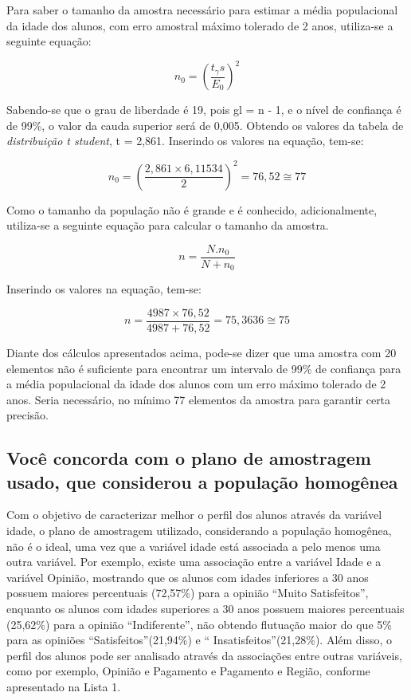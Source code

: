 Para saber o tamanho da amostra necessário para estimar a média populacional da idade dos alunos, com erro amostral máximo tolerado de 2 anos, utiliza-se a seguinte equação:

\begin{equation*}
  n_0 = \left (\frac{t_\gamma s}{E_0} \right)^2
\end{equation*}

Sabendo-se que o grau de liberdade é 19, pois gl = n - 1, e o nível de confiança é de 99\%, o valor da cauda superior será de 0,005. Obtendo os valores da tabela de \textit{distribuição t student}, t 
= 2,861. Inserindo os valores na equação, tem-se:

\begin{equation*}
 n_0 = \left (\frac{2,861 \times 6,11534}{2} \right)^2 = 76,52 \cong 77
\end{equation*}

Como o tamanho da população não é grande e é conhecido, adicionalmente, utiliza-se a seguinte equação para calcular o tamanho da amostra.

\begin{equation*}
 n = \frac{N . n_0}{N + n_0}
\end{equation*}

Inserindo os valores na equação, tem-se:

\begin{equation*}
 n = \frac{4987 \times 76,52}{4987 + 76,52} = 75,3636 \cong 75
\end{equation*}

Diante dos cálculos apresentados acima, pode-se dizer que uma amostra com 20 elementos não é suficiente para encontrar um intervalo de 99\% de confiança para a média populacional da idade dos alunos 
com um erro máximo tolerado de 2 anos. Seria necessário, no mínimo 77 elementos da amostra para garantir certa precisão. 

\subsection{Você concorda com o plano de amostragem usado, que considerou a população homogênea}
Com o objetivo de caracterizar melhor o perfil dos alunos através da variável idade, o plano de amostragem utilizado, considerando a população homogênea, não é o ideal, uma vez que a variável idade 
está associada a pelo menos uma outra variável. Por exemplo, existe uma associação entre a variável Idade e a variável Opinião, mostrando que os alunos com idades inferiores a 30 anos possuem maiores 
percentuais (72,57\%) para a opinião \textquotedblleft Muito Satisfeitos\textquotedblright, enquanto os alunos com idades superiores a 30 anos possuem maiores percentuais (25,62\%) para a opinião 
\textquotedblleft Indiferente\textquotedblright, não obtendo flutuação maior do que 5\% para as opiniões \textquotedblleft Satisfeitos\textquotedblright (21,94\%) e \textquotedblleft 
Insatisfeitos\textquotedblright (21,28\%). Além disso, o perfil dos alunos pode ser analisado através da associações entre outras variáveis, como por exemplo, Opinião e Pagamento e Pagamento e 
Região, conforme apresentado na Lista 1. 

